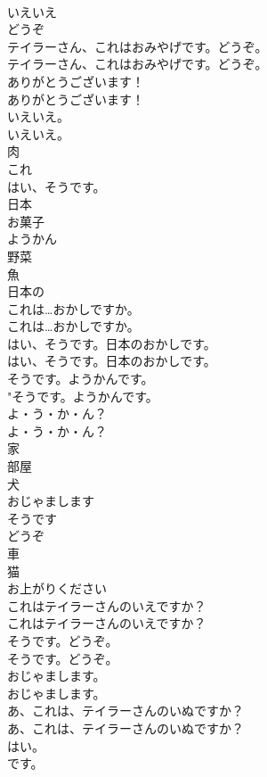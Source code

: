 \documentclass[8pt]{extreport}
\begin{document}
\begin{CJK}{UTF8}{min}
\\	いえいえ
\\	どうぞ
\\	テイラーさん、これはおみやげです。どうぞ。	
\\	テイラーさん、これはおみやげです。どうぞ。 
\\	ありがとうございます！	
\\	ありがとうございます！ 
\\	いえいえ。	
\\	いえいえ。 
\\	肉
\\	これ
\\	はい、そうです。
\\	日本
\\	お菓子
\\	ようかん
\\	野菜
\\	魚
\\	日本の
\\	これは…おかしですか。	
\\	これは…おかしですか。 
\\	はい、そうです。日本のおかしです。	
\\	はい、そうです。日本のおかしです。 
\\	そうです。ようかんです。	
\\	"そうです。ようかんです。 
\\	よ・う・か・ん？	
\\	よ・う・か・ん？ 
\\	家
\\	部屋
\\	犬
\\	おじゃまします
\\	そうです
\\	どうぞ
\\	車
\\	猫
\\	お上がりください
\\	これはテイラーさんのいえですか？	
\\	これはテイラーさんのいえですか？ 
\\	そうです。どうぞ。	
\\	そうです。どうぞ。 
\\	おじゃまします。	
\\	おじゃまします。 
\\	あ、これは、テイラーさんのいぬですか？	
\\	あ、これは、テイラーさんのいぬですか？ 
\\	はい。
\\	です。	

\end{CJK}
\end{document}
